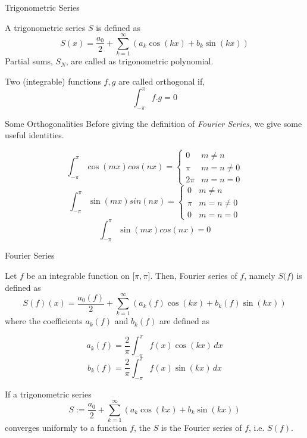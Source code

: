 \documentclass{beamer}
\begin{document}
\begin{frame}{Trigonometric Series}
\small
    \begin{definition}
        A trigonometric series $S$ is defined as 
        \[
        S(x) = \frac{a_0}{2} +  \sum_{k = 1}^{\infty} (a_k  \cos(kx) + b_k  \sin(kx))
        \]
        Partial sums, $S_N$, are called as trigonometric polynomial.
        
    \end{definition}
    \begin{definition}[Orthogonality]
        Two (integrable) functions $f, g$ are called orthogonal if,
        \[
        \int_{-\pi}^{\pi}f.g = 0
        \]
    \end{definition}
        
\end{frame}
\begin{frame}{Some Orthogonalities}
\small
    Before giving the definition of \textit{Fourier Series}, we give some useful identities.

    \[
    \int_{-\pi}^{\pi} \cos(mx)cos(nx) = \begin{cases} 
                                        0 & m \neq n \\
                                      \pi &  m = n \neq 0\\
                                     2\pi & m = n = 0
                                        \end{cases}
    \]
    \[
    \int_{-\pi}^{\pi} \sin(mx)sin(nx) = \begin{cases} 
                                        0 & m \neq n \\
                                      \pi &  m = n \neq 0\\
                                        0 & m = n = 0
                                        \end{cases}
    \]
    \[
    \int_{-\pi}^{\pi} \sin(mx)cos(nx) = 0  
    \]
\end{frame}
\begin{frame}[shrink=9]{Fourier Series}
\small
    \begin{definition}
        Let \(f\) be an integrable function on [$\pi, \pi$]. Then, Fourier series of \(f\), namely $S($\(f\)) is defined as
    \[
    S(f)(x) = \frac{a_0(f)}{2} +  \sum_{k = 1}^{\infty} (a_k(f)  \cos(kx) + b_k(f)  \sin(kx))
    \]
    where the coefficients $a_k(f)$ and $b_k(f)$ are defined as

    \[
    a_k(f) = \frac{2}{\pi}\int_{-\pi}^{\pi} f(x) \cos(kx)\,dx
    \]
    \[
    b_k(f) = \frac{2}{\pi}\int_{-\pi}^{\pi} f(x) \sin(kx)\,dx
    \]
    \end{definition}

    \begin{theorem}[Fourier]
    If a trigonometric series 
    \[
    S := \frac{a_0}{2} +  \sum_{k = 1}^{\infty} (a_k  \cos(kx) + b_k  \sin(kx))
    \]
   converges uniformly to a function \(f\), the $S$ is the Fourier series of \(f\), i.e. $S(f)$.
\end{theorem}
\end{frame}
\end{document}
